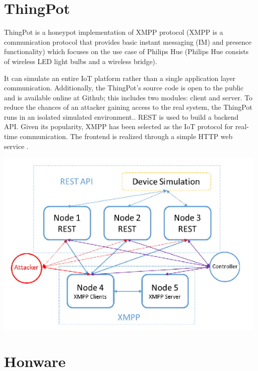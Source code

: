 \documentclass[epsfig,a4paper,11pt,titlepage,oneside,openany]{book}
\begin{document}
\section{ThingPot}
ThingPot is a honeypot implementation of XMPP protocol (XMPP is a communication protocol that provides basic instant messaging (IM) and presence functionality) which focuses on the use case of Philips Hue (Philips Hue consists of wireless LED light bulbs and a wireless bridge). 

It can simulate an entire IoT platform rather than a single application layer communication. Additionally, the ThingPot’s source code is open to the public and is available online at Github; this includes two modules: client and server. To reduce the chances of an attacker gaining access to the real system, the ThingPot runs in an isolated simulated environment.. REST is used to build a backend API. Given its popularity, XMPP has been selected as the IoT protocol for real-time communication. The frontend is realized through a simple HTTP web service \cite{wang2018thingpot}.
\begin{center}
\includegraphics[scale=0.40]{thingpot}
\end{center}


\section{Honware}
\end{document}
